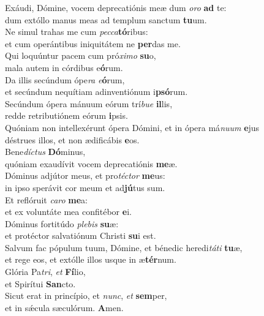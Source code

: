 \evenverse Exáudi, Dómine, vocem deprecatiónis meæ dum \textit{o}\textit{ro} \textbf{ad} te:~\*\\
\evenverse dum extóllo manus meas ad templum sanctum \textbf{tu}um.\\
\oddverse Ne simul trahas me cum \textit{pec}\textit{ca}\textbf{tó}ribus:~\*\\
\oddverse et cum operántibus iniquitátem ne \textbf{per}das me.\\
\evenverse Qui loquúntur pacem cum pró\textit{xi}\textit{mo} \textbf{su}o,~\*\\
\evenverse mala autem in córdibus e\textbf{ó}rum.\\
\oddverse Da illis secúndum ópe\textit{ra} \textit{e}\textbf{ó}rum,~\*\\
\oddverse et secúndum nequítiam adinventiónum i\textbf{psó}rum.\\
\evenverse Secúndum ópera mánuum eórum trí\textit{bu}\textit{e} \textbf{il}lis,~\*\\
\evenverse redde retributiónem eórum \textbf{i}psis.\\
\oddverse Quóniam non intellexérunt ópera Dómini, et in ópera má\textit{nu}\textit{um} \textbf{e}jus~\*\\
\oddverse déstrues illos, et non ædificábis \textbf{e}os.\\
\evenverse Bene\textit{dí}\textit{ctus} \textbf{Dó}minus,~\*\\
\evenverse quóniam exaudívit vocem deprecatiónis \textbf{me}æ.\\
\oddverse Dóminus adjútor meus, et pro\textit{té}\textit{ctor} \textbf{me}us:~\*\\
\oddverse in ipso sperávit cor meum et ad\textbf{jú}tus sum.\\
\evenverse Et reflóruit \textit{ca}\textit{ro} \textbf{me}a:~\*\\
\evenverse et ex voluntáte mea confitébor \textbf{e}i.\\
\oddverse Dóminus fortitúdo \textit{ple}\textit{bis} \textbf{su}æ:~\*\\
\oddverse et protéctor salvatiónum Christi \textbf{su}i est.\\
\evenverse Salvum fac pópulum tuum, Dómine, et bénedic heredi\textit{tá}\textit{ti} \textbf{tu}æ,~\*\\
\evenverse et rege eos, et extólle illos usque in æ\textbf{tér}num.\\
\oddverse Glória Pa\textit{tri}, \textit{et} \textbf{Fí}lio,~\*\\
\oddverse et Spirítui \textbf{San}cto.\\
\evenverse Sicut erat in princípio, et \textit{nunc}, \textit{et} \textbf{sem}per,~\*\\
\evenverse et in sǽcula sæculórum. \textbf{A}men.\\
